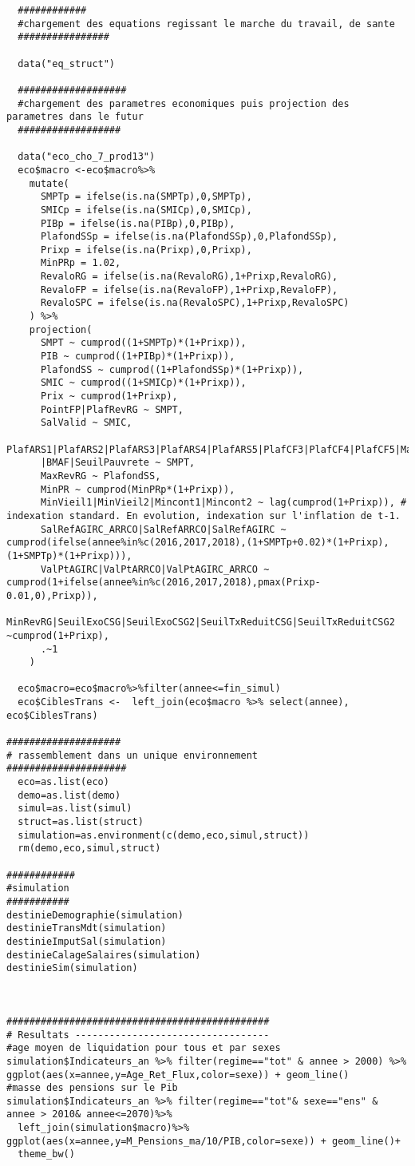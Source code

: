 \begin{enumerate}
\begin{lstlisting}
  ############
  #chargement des equations regissant le marche du travail, de sante 
  ################

  data("eq_struct")
  
  ###################
  #chargement des parametres economiques puis projection des parametres dans le futur
  ##################

  data("eco_cho_7_prod13")
  eco$macro <-eco$macro%>%
    mutate( 
      SMPTp = ifelse(is.na(SMPTp),0,SMPTp),
      SMICp = ifelse(is.na(SMICp),0,SMICp),
      PIBp = ifelse(is.na(PIBp),0,PIBp),
      PlafondSSp = ifelse(is.na(PlafondSSp),0,PlafondSSp),
      Prixp = ifelse(is.na(Prixp),0,Prixp),
      MinPRp = 1.02,
      RevaloRG = ifelse(is.na(RevaloRG),1+Prixp,RevaloRG),
      RevaloFP = ifelse(is.na(RevaloFP),1+Prixp,RevaloFP),
      RevaloSPC = ifelse(is.na(RevaloSPC),1+Prixp,RevaloSPC)
    ) %>%
    projection(
      SMPT ~ cumprod((1+SMPTp)*(1+Prixp)),
      PIB ~ cumprod((1+PIBp)*(1+Prixp)),
      PlafondSS ~ cumprod((1+PlafondSSp)*(1+Prixp)),
      SMIC ~ cumprod((1+SMICp)*(1+Prixp)),
      Prix ~ cumprod(1+Prixp),
      PointFP|PlafRevRG ~ SMPT,
      SalValid ~ SMIC,
      PlafARS1|PlafARS2|PlafARS3|PlafARS4|PlafARS5|PlafCF3|PlafCF4|PlafCF5|MajoPlafCF|sGMP
      |BMAF|SeuilPauvrete ~ SMPT,
      MaxRevRG ~ PlafondSS,
      MinPR ~ cumprod(MinPRp*(1+Prixp)),
      MinVieil1|MinVieil2|Mincont1|Mincont2 ~ lag(cumprod(1+Prixp)), # indexation standard. En evolution, indexation sur l'inflation de t-1.
      SalRefAGIRC_ARRCO|SalRefARRCO|SalRefAGIRC ~  cumprod(ifelse(annee%in%c(2016,2017,2018),(1+SMPTp+0.02)*(1+Prixp),(1+SMPTp)*(1+Prixp))),
      ValPtAGIRC|ValPtARRCO|ValPtAGIRC_ARRCO ~ cumprod(1+ifelse(annee%in%c(2016,2017,2018),pmax(Prixp-0.01,0),Prixp)),
      MinRevRG|SeuilExoCSG|SeuilExoCSG2|SeuilTxReduitCSG|SeuilTxReduitCSG2 ~cumprod(1+Prixp),
      .~1
    ) 

  eco$macro=eco$macro%>%filter(annee<=fin_simul)
  eco$CiblesTrans <-  left_join(eco$macro %>% select(annee), eco$CiblesTrans)
  
####################
# rassemblement dans un unique environnement
#####################
  eco=as.list(eco)
  demo=as.list(demo)
  simul=as.list(simul)
  struct=as.list(struct)
  simulation=as.environment(c(demo,eco,simul,struct))
  rm(demo,eco,simul,struct)
  
############
#simulation
###########
destinieDemographie(simulation)
destinieTransMdt(simulation)
destinieImputSal(simulation)
destinieCalageSalaires(simulation)
destinieSim(simulation)



##############################################
# Resultats ----------------------------------
#age moyen de liquidation pour tous et par sexes
simulation$Indicateurs_an %>% filter(regime=="tot" & annee > 2000) %>% ggplot(aes(x=annee,y=Age_Ret_Flux,color=sexe)) + geom_line()
#masse des pensions sur le Pib
simulation$Indicateurs_an %>% filter(regime=="tot"& sexe=="ens" & annee > 2010& annee<=2070)%>%
  left_join(simulation$macro)%>% ggplot(aes(x=annee,y=M_Pensions_ma/10/PIB,color=sexe)) + geom_line()+
  theme_bw()
\end{lstlisting}
\end{enumerate}


